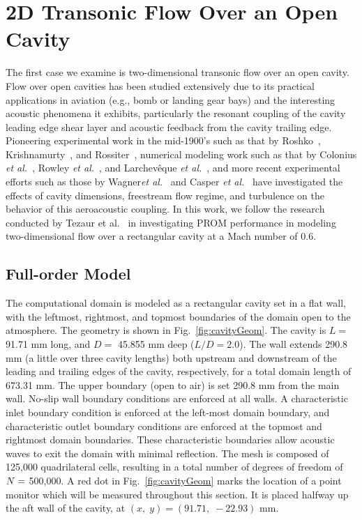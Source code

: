 \section{2D Transonic Flow Over an Open Cavity}\label{sec:cavity}

The first case we examine is two-dimensional transonic flow over an open cavity. Flow over open cavities has been studied extensively due to its practical applications in aviation (e.g., bomb or landing gear bays) and the interesting acoustic phenomena it exhibits, particularly the resonant coupling of the cavity leading edge shear layer and acoustic feedback from the cavity trailing edge. Pioneering experimental work in the mid-1900's such as that by Roshko~\cite{Roshko1952}, Krishnamurty~\cite{Krishnamurty1955}, and Rossiter~\cite{Rossiter1964}, numerical modeling work such as that by Colonius \textit{et al.}~\cite{Colonius1999}, Rowley \textit{et al.}~\cite{Rowley2002}, and Larchev\^{e}que \textit{et al.}~\cite{Larcheveque2007}, and more recent experimental efforts such as those by Wagner\textit{et al.}~\cite{Wagner2015} and Casper \textit{et al.}~\cite{Casper2018} have investigated the effects of cavity dimensions, freestream flow regime, and turbulence on the behavior of this aeroacoustic coupling. In this work, we follow the research conducted by Tezaur et al.~\cite{Tezaur2016,Tezaur2017} in investigating PROM performance in modeling two-dimensional flow over a rectangular cavity at a Mach number of 0.6.

\subsection{Full-order Model}

The computational domain is modeled as a rectangular cavity set in a flat wall, with the leftmost, rightmost, and topmost boundaries of the domain open to the atmosphere. The geometry is shown in Fig.~\ref{fig:cavityGeom}. The cavity is $L =$ 91.71 mm long, and $D =$ 45.855 mm deep ($L/D = 2.0$). The wall extends 290.8 mm (a little over three cavity lengths) both upstream and downstream of the leading and trailing edges of the cavity, respectively, for a total domain length of 673.31 mm. The upper boundary (open to air) is set 290.8 mm from the main wall. No-slip wall boundary conditions are enforced at all walls. A characteristic inlet boundary condition is enforced at the left-most domain boundary, and characteristic outlet boundary conditions are enforced at the topmost and rightmost domain boundaries. These characteristic boundaries allow acoustic waves to exit the domain with minimal reflection. The mesh is composed of 125,000 quadrilateral cells, resulting in a total number of degrees of freedom of $N =$ 500,000. A red dot in Fig.~\ref{fig:cavityGeom} marks the location of a point monitor which will be measured throughout this section. It is placed halfway up the aft wall of the cavity, at $(x, \; y) = (91.71, \; -22.93)$ mm.

